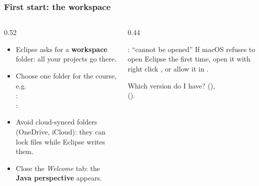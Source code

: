 \documentclass[aspectratio=169,10pt,compress]{beamer}
\begin{document}
\begin{frame}[t,fragile] \frametitle{First start: the workspace}
  \begin{columns}[T]
    \begin{column}{0.52\textwidth}
      \begin{itemize}\small
        \item Eclipse asks for a \textbf{workspace} folder: all your projects go there.
        \item Choose one folder for the course, e.g.\\
              \win: \\
              \mac: 
        \item Avoid cloud-synced folders (OneDrive, iCloud): they can lock files while Eclipse writes them.
        \item Close the \emph{Welcome} tab: the \textbf{Java perspective} appears.
      \end{itemize}
    \end{column}
    \begin{column}{0.44\textwidth}
      \begin{block}{\mac: ``cannot be opened''}
        \small If macOS refuses to open Eclipse the first time, open it with right click ,
        or allow it in .
      \end{block}
      \begin{block}{Which version do I have?}
        \small 
         (\win), \\
         (\mac).
      \end{block}
    \end{column}
  \end{columns}
\end{frame}

\end{document}
